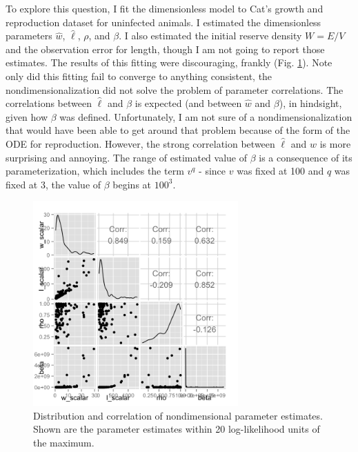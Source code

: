 \documentclass[12pt,reqno,final,pdftex]{amsart}\usepackage[]{graphicx}\usepackage[]{color}
\newenvironment{knitrout}{}{} %
\theoremstyle{plain}
\numberwithin{equation}{part}
\begin{document}
To explore this question, I fit the dimensionless model to Cat's growth and reproduction dataset for uninfected animals.
I estimated the dimensionless parameters $\hat{w}$, $\hat{\ell}$, $\rho$, and $\beta$.
I also estimated the initial reserve density $W=E/V$ and the observation error for length, though I am not going to report those estimates.
The results of this fitting were discouraging, frankly (Fig. \ref{fig:nondim-fig}).
Note only did this fitting fail to converge to anything consistent, the nondimensionalization did not solve the problem of parameter correlations.
The correlations between $\hat{\ell}$ and $\beta$ is expected (and between $\hat{w}$ and $\beta$), in hindsight, given how $\beta$ was defined.
Unfortunately, I am not sure of a nondimensionalization that would have been able to get around that problem because of the form of the ODE for reproduction.
However, the strong correlation between $\hat{\ell}$ and $\hat{w}$ is more surprising and annoying.
The range of estimated value of $\beta$ is a consequence of its parameterization, which includes the term $v^q$ - since $v$ was fixed at 100 and $q$ was fixed at 3, the value of $\beta$ begins at $100^3$.

\begin{knitrout}\scriptsize
{}\color{fgcolor}\begin{figure}

\includegraphics[width=0.7\textwidth]{figure/nondim-fig-1} \hfill{}

\caption[Distribution and correlation of nondimensional parameter estimates]{Distribution and correlation of nondimensional parameter estimates. Shown are the parameter estimates within 20 log-likelihood units of the maximum.}\label{fig:nondim-fig}
\end{figure}


\end{knitrout}
\end{document}
